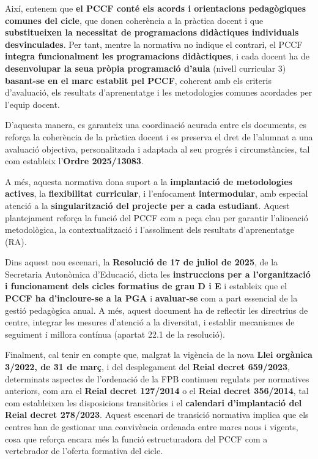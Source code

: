 \documentclass[
  paper=a4,
  ,captions=tableheading
]{scrartcl}
\begin{document}
Així, entenem que \textbf{el PCCF conté els acords i orientacions
pedagògiques comunes del cicle}, que donen coherència a la pràctica
docent i que \textbf{substitueixen la necessitat de programacions
didàctiques individuals desvinculades}. Per tant, mentre la normativa no
indique el contrari, el PCCF \textbf{integra funcionalment les
programacions didàctiques}, i cada docent ha de \textbf{desenvolupar la
seua pròpia programació d'aula} (nivell curricular 3) \textbf{basant-se
en el marc establit pel PCCF}, coherent amb els criteris d'avaluació,
els resultats d'aprenentatge i les metodologies comunes acordades per
l'equip docent.

D'aquesta manera, es garanteix una coordinació acurada entre els
documents, es reforça la coherència de la pràctica docent i es preserva
el dret de l'alumnat a una avaluació objectiva, personalitzada i
adaptada al seu progrés i circumstàncies, tal com estableix
l'\textbf{Ordre 2025/13083}.

A més, aquesta normativa dona suport a la \textbf{implantació de
metodologies actives}, la \textbf{flexibilitat curricular}, i
l'enfocament \textbf{intermodular}, amb especial atenció a la
\textbf{singularització del projecte per a cada estudiant}. Aquest
plantejament reforça la funció del PCCF com a peça clau per garantir
l'alineació metodològica, la contextualització i l'assoliment dels
resultats d'aprenentatge (RA).

Dins aquest nou escenari, la \textbf{Resolució de 17 de juliol de 2025},
de la Secretaria Autonòmica d'Educació, dicta les \textbf{instruccions
per a l'organització i funcionament dels cicles formatius de grau D i E}
i estableix que el \textbf{PCCF ha d'incloure-se a la PGA} i
\textbf{avaluar-se} com a part essencial de la gestió pedagògica anual.
A més, aquest document ha de reflectir les directrius de centre,
integrar les mesures d'atenció a la diversitat, i establir mecanismes de
seguiment i millora contínua (apartat 22.1 de la resolució).

Finalment, cal tenir en compte que, malgrat la vigència de la nova
\textbf{Llei orgànica 3/2022, de 31 de març}, i del desplegament del
\textbf{Reial decret 659/2023}, determinats aspectes de l'ordenació de
la FPB continuen regulats per normatives anteriors, com ara el
\textbf{Reial decret 127/2014} o el \textbf{Reial decret 356/2014}, tal
com estableixen les disposicions transitòries i el \textbf{calendari
d'implantació del Reial decret 278/2023}. Aquest escenari de transició
normativa implica que els centres han de gestionar una convivència
ordenada entre marcs nous i vigents, cosa que reforça encara més la
funció estructuradora del PCCF com a vertebrador de l'oferta formativa
del cicle.
\end{document}
